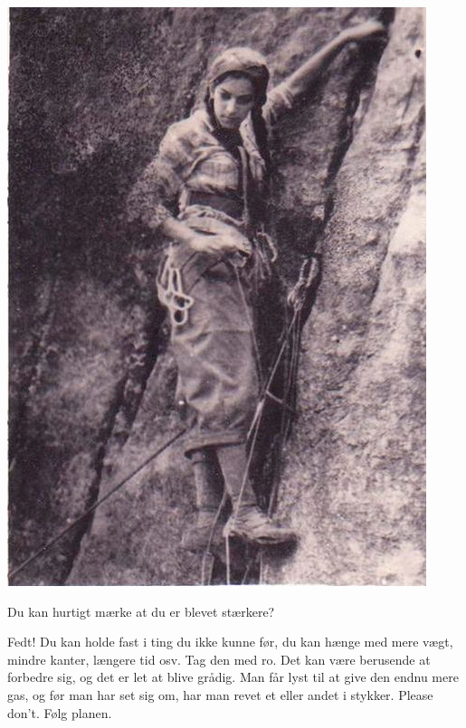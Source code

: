 \begin{multicols}{2}
  \begin{minipage}{\columnwidth}
    \centering
    \includegraphics{figs/oldSchoolCool}
    \vspace{1em}
  \end{minipage}

  \begin{tList}{Du kan hurtigt mærke at du er blevet stærkere?}
  \item   Fedt! Du kan holde
    fast i ting du ikke kunne før, du kan hænge med mere vægt, mindre
    kanter, længere tid osv. Tag den med ro. Det kan være berusende at
    forbedre sig, og det er let at blive grådig. Man får lyst til at
    give den endnu mere gas, og før man har set sig om, har man revet
    et eller andet i stykker. Please don't. Følg planen.
  \end{tList}
\end{multicols}

